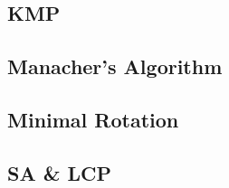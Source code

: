 \subsection{KMP}

\subsection{Manacher's Algorithm}

\subsection{Minimal Rotation}

\subsection{SA \& LCP}


